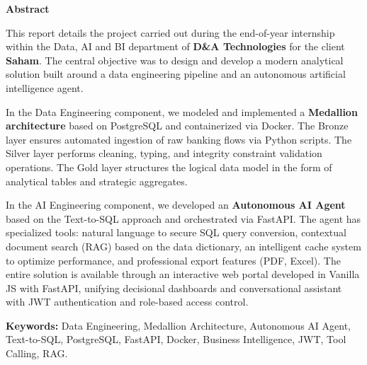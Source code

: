 \documentclass[a4paper,12pt]{report}
\begin{document}
\newpage
\thispagestyle{empty}
\begin{center}
\vspace{1cm}
    \textbf{\huge{Abstract}}
\end{center}
\vspace{1cm}
\begin{doublespace}
\large
\noindent
This report details the project carried out during the end-of-year internship within the Data, AI and BI department of \textbf{D\&A Technologies} for the client \textbf{Saham}. The central objective was to design and develop a modern analytical solution built around a data engineering pipeline and an autonomous artificial intelligence agent.

\noindent
In the Data Engineering component, we modeled and implemented a \textbf{Medallion architecture} based on PostgreSQL and containerized via Docker. The Bronze layer ensures automated ingestion of raw banking flows via Python scripts. The Silver layer performs cleaning, typing, and integrity constraint validation operations. The Gold layer structures the logical data model in the form of analytical tables and strategic aggregates.

\noindent
In the AI Engineering component, we developed an \textbf{Autonomous AI Agent} based on the Text-to-SQL approach and orchestrated via FastAPI. The agent has specialized tools: natural language to secure SQL query conversion, contextual document search (RAG) based on the data dictionary, an intelligent cache system to optimize performance, and professional export features (PDF, Excel). The entire solution is available through an interactive web portal developed in Vanilla JS with FastAPI, unifying decisional dashboards and conversational assistant with JWT authentication and role-based access control.
\end{doublespace}

\vspace{0.8cm}
\noindent \textbf{Keywords:} Data Engineering, Medallion Architecture, Autonomous AI Agent, Text-to-SQL, PostgreSQL, FastAPI, Docker, Business Intelligence, JWT, Tool Calling, RAG.

\newpage
\begin{doublespace}
\setcounter{tocdepth}{2}
\tableofcontents

\cleardoublepage
\listoffigures

\cleardoublepage
\listoftables
\end{doublespace}
\end{document}
